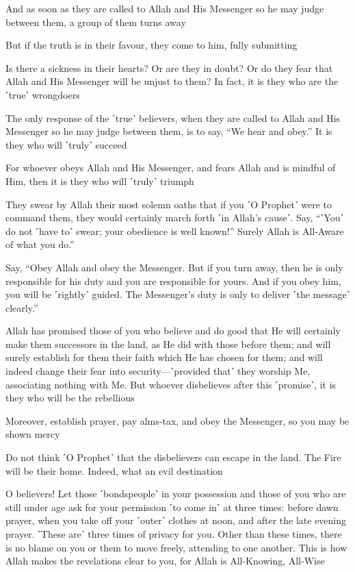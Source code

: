 And as soon as they are called to Allah and His Messenger so he may judge between them, a group of them turns away

But if the truth is in their favour, they come to him, fully submitting

Is there a sickness in their hearts? Or are they in doubt? Or do they fear that Allah and His Messenger will be unjust to them? In fact, it is they who are the ˹true˺ wrongdoers

The only response of the ˹true˺ believers, when they are called to Allah and His Messenger so he may judge between them, is to say, “We hear and obey.” It is they who will ˹truly˺ succeed

For whoever obeys Allah and His Messenger, and fears Allah and is mindful of Him, then it is they who will ˹truly˺ triumph

They swear by Allah their most solemn oaths that if you ˹O Prophet˺ were to command them, they would certainly march forth ˹in Allah’s cause˺. Say, “˹You˺ do not ˹have to˺ swear; your obedience is well known!” Surely Allah is All-Aware of what you do.”

Say, “Obey Allah and obey the Messenger. But if you turn away, then he is only responsible for his duty and you are responsible for yours. And if you obey him, you will be ˹rightly˺ guided. The Messenger’s duty is only to deliver ˹the message˺ clearly.”

Allah has promised those of you who believe and do good that He will certainly make them successors in the land, as He did with those before them; and will surely establish for them their faith which He has chosen for them; and will indeed change their fear into security—˹provided that˺ they worship Me, associating nothing with Me. But whoever disbelieves after this ˹promise˺, it is they who will be the rebellious

Moreover, establish prayer, pay alms-tax, and obey the Messenger, so you may be shown mercy

Do not think ˹O Prophet˺ that the disbelievers can escape in the land. The Fire will be their home. Indeed, what an evil destination

O believers! Let those ˹bondspeople˺ in your possession and those of you who are still under age ask for your permission ˹to come in˺ at three times: before dawn prayer, when you take off your ˹outer˺ clothes at noon, and after the late evening prayer. ˹These are˺ three times of privacy for you. Other than these times, there is no blame on you or them to move freely, attending to one another. This is how Allah makes the revelations clear to you, for Allah is All-Knowing, All-Wise

